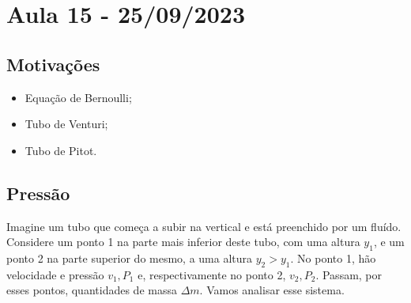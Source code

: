 \documentclass[physicsII_notes.tex]{subfiles}
\begin{document}
\section{Aula 15 - 25/09/2023}
\subsection{Motivações}
\begin{itemize}
	\item Equação de Bernoulli;
	\item Tubo de Venturi;
	\item Tubo de Pitot.
\end{itemize}
\subsection{Pressão}
Imagine um tubo que começa a subir na vertical e está preenchido por um fluído. Considere um ponto 1 na parte mais inferior deste tubo, com uma altura \(y_{1}\),
e um ponto 2 na parte superior do mesmo, a uma altura \(y_{2} > y_{1}\). No ponto 1, hão velocidade e pressão \(v_{1}, P_{1}\) e, respectivamente no ponto 2, \(v_{2}, P_{2}\).
Passam, por esses pontos, quantidades de massa \(\Delta m\). Vamos analisar esse sistema.
\end{document}
